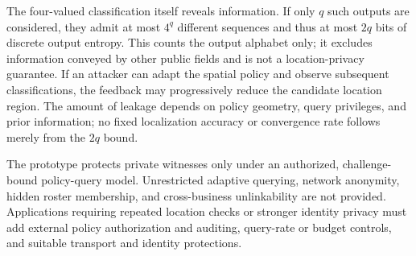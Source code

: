 The four-valued classification itself reveals information. If only $q$ such outputs are considered, they admit at most $4^q$ different sequences and thus at most $2q$ bits of discrete output entropy. This counts the output alphabet only; it excludes information conveyed by other public fields and is not a location-privacy guarantee. If an attacker can adapt the spatial policy and observe subsequent classifications, the feedback may progressively reduce the candidate location region. The amount of leakage depends on policy geometry, query privileges, and prior information; no fixed localization accuracy or convergence rate follows merely from the $2q$ bound.

The prototype protects private witnesses only under an authorized, challenge-bound policy-query model. Unrestricted adaptive querying, network anonymity, hidden roster membership, and cross-business unlinkability are not provided. Applications requiring repeated location checks or stronger identity privacy must add external policy authorization and auditing, query-rate or budget controls, and suitable transport and identity protections.
